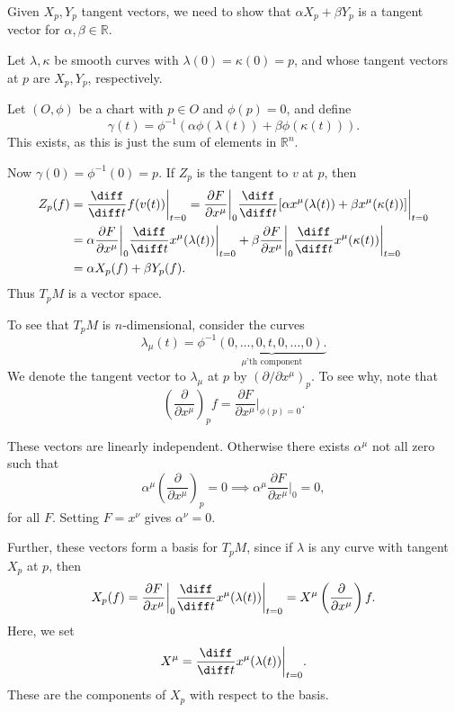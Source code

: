 \documentclass[12pt]{article}
\begin{document}
\begin{proofbox}
	Given $X_p, Y_p$ tangent vectors, we need to show that $\alpha X_p + \beta Y_p$ is a tangent vector for $\alpha, \beta \in \mathbb{R}$.

	Let $\lambda, \kappa$ be smooth curves with $\lambda(0) = \kappa(0) = p$, and whose tangent vectors at $p$ are $X_p, Y_p$, respectively.

	Let $(O, \phi)$ be a chart with $p \in O$ and $\phi(p) = 0$, and define
	\[
	\gamma(t) = \phi^{-1}( \alpha \phi(\lambda (t)) + \beta \phi (\kappa (t)) ).
	\]
	This exists, as this is just the sum of elements in $\mathbb{R}^n$.

	Now $\gamma(0) = \phi^{-1}(0) = p$. If $Z_p$ is the tangent to $v$ at $p$, then
	\begin{align*}
		Z_p(f) &= \frac{\diff}{\diff t} f(v(t)) \biggr|_{t = 0} = \frac{\partial F}{\partial x^\mu} \biggr|_{0} \frac{\diff}{\diff t} [\alpha x^\mu (\lambda(t)) + \beta x^\mu(\kappa(t)) ] \biggr|_{t = 0} \\
		       &= \alpha \frac{\partial F}{\partial x^\mu} \biggr|_0 \frac{\diff}{\diff t} x^\mu(\lambda(t)) \biggr|_{t = 0} + \beta \frac{\partial F}{\partial x^\mu} \biggr|_0 \frac{\diff}{\diff t} x^\mu(\kappa(t)) \biggr|_{t =0} \\
		       &= \alpha X_p(f) + \beta Y_p(f).
	\end{align*}
	Thus $T_p M$ is a vector space.

	To see that $T_p M$ is $n$-dimensional, consider the curves
	\[
		\lambda_\mu(t) = \phi^{-1} \underbrace{(0, \ldots, 0, t, 0, \ldots, 0).}_{\mu\text{'th component}}
	\]
	We denote the tangent vector to $\lambda_\mu$ at $p$ by $(\partial / \partial x^\mu)_p$. To see why, note that
	\[
	\left(\frac{\partial}{\partial x^\mu} \right)_p f = \frac{\partial F}{\partial x^\mu} \biggr|_{\phi(p) = 0}.
	\]

	These vectors are linearly independent. Otherwise there exists $\alpha^\mu$ not all zero such that
	\[
	\alpha^\mu \left( \frac{\partial}{\partial x^\mu} \right)_p = 0 \implies \alpha^\mu \frac{\partial F}{\partial x^\mu} \biggr|_0 = 0,
	\]
	for all $F$. Setting $F = x^\nu$ gives $\alpha^\nu = 0$.

	Further, these vectors form a basis for $T_p M$, since if $\lambda$ is any curve with tangent $X_p$ at $p$, then
	\[
	X_p(f) = \frac{\partial F}{\partial x^\mu} \biggr|_0 \frac{\diff}{\diff t} x^\mu(\lambda(t)) \biggr|_{t = 0} = X^\mu \left( \frac{\partial}{\partial x^\mu} \right) f.
	\]
	Here, we set
	\[
	X^\mu = \frac{\diff}{\diff t} x^\mu(\lambda(t)) \biggr|_{t = 0}.
	\]
	These are the components of $X_p$ with respect to the basis.
\end{proofbox}
\end{document}
